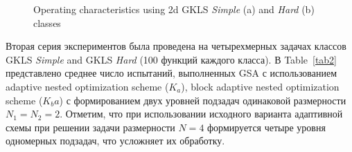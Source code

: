 \documentclass[runningheads]{llncs}
\begin{document}
\begin{figure}
\begin{minipage}{0.5\linewidth}
\end{minipage}
\begin{minipage}{0.5\linewidth}
\end{minipage}
\caption{Operating characteristics using 2d GKLS \textit{Simple} (a) and \textit{Hard} (b) classes}
\label{fig2}
\end{figure}

Вторая серия экспериментов была проведена на четырехмерных задачах классов GKLS \textit{Simple} and GKLS \textit{Hard} (100 функций каждого класса). В Table~\ref{tab2}  представлено среднее число испытаний, выполненных GSA с использованием adaptive nested optimization scheme ($K_a$), block adaptive nested optimization scheme ($K_ba$) с формированием двух уровней подзадач одинаковой размерности $N_1=N_2=2$. Отметим, что при использовании исходного варианта адаптивной схемы при решении задачи размерности $N=4$ формируется четыре уровня одномерных подзадач, что усложняет их обработку.
\end{document}
